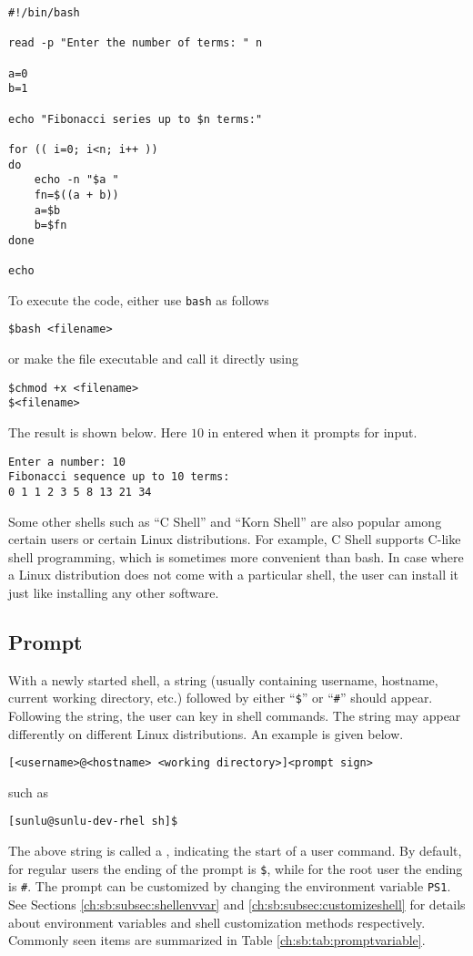 \begin{lstlisting}
#!/bin/bash

read -p "Enter the number of terms: " n

a=0
b=1

echo "Fibonacci series up to $n terms:"

for (( i=0; i<n; i++ ))
do
    echo -n "$a "
    fn=$((a + b))
    a=$b
    b=$fn
done

echo
\end{lstlisting}

To execute the code, either use \verb|bash| as follows
\begin{lstlisting}
$bash <filename>
\end{lstlisting}
or make the file executable and call it directly using
\begin{lstlisting}
$chmod +x <filename>
$<filename>
\end{lstlisting}
The result is shown below. Here $10$ in entered when it prompts for input.
\begin{lstlisting}
Enter a number: 10
Fibonacci sequence up to 10 terms:
0 1 1 2 3 5 8 13 21 34
\end{lstlisting}

Some other shells such as ``C Shell'' and ``Korn Shell'' are also popular among certain users or certain Linux distributions. For example, C Shell supports C-like shell programming, which is sometimes more convenient than bash. In case where a Linux distribution does not come with a particular shell, the user can install it just like installing any other software.

\subsection{Prompt}

With a newly started shell, a string (usually containing username, hostname, current working directory, etc.) followed by either ``\verb|$|'' or ``\verb|#|'' should appear. Following the string, the user can key in shell commands. The string may appear differently on different Linux distributions. An example is given below.
\begin{lstlisting}
[<username>@<hostname> <working directory>]<prompt sign>
\end{lstlisting}
such as
\begin{lstlisting}
[sunlu@sunlu-dev-rhel sh]$
\end{lstlisting}

The above string is called a , indicating the start of a user command. By default, for regular users the ending of the prompt is \verb|$|, while for the root user the ending is \verb|#|. The prompt can be customized by changing the environment variable \verb|PS1|. See Sections \ref{ch:sb:subsec:shellenvvar} and \ref{ch:sb:subsec:customizeshell} for details about environment variables and shell customization methods respectively. Commonly seen items are summarized in Table \ref{ch:sb:tab:promptvariable}.


